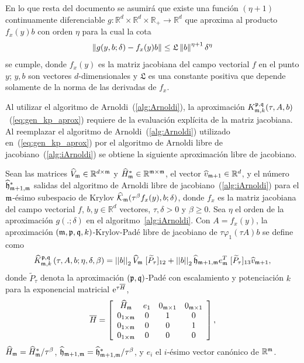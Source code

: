 En lo que resta del documento se asumirá que existe una función $(\eta+1)$ continuamente diferenciable $g: \mathbb{R}^{d}\times \mathbb{R}^{d} \times \mathbb{R}_+ \to \mathbb{R}^{d}$ que aproxima al producto $f_x(y)b$ con orden $\eta$ para la cual la cota
\begin{equation} \label{eq:g_bound}
	\left\lVert g(y,b;\delta)-f_x(y)b \right\rVert \leq \mathfrak{L}\left\lVert b \right\rVert^{\eta+1}\delta^{\eta}
\end{equation}
se cumple, donde $f_x(y)$ es la matriz jacobiana del campo vectorial $f$ en el punto $y$; $y,b$ son vectores $d$-dimensionales y $\mathfrak{L}$ es una constante positiva que depende solamente de la norma de las derivadas de $f_x$.

Al utilizar el algoritmo de Arnoldi~(\ref{alg:Arnoldi}), la aproximación $K_{\mathfrak{m},k}^{\mathfrak{p},\mathfrak{q}}(\tau,A,b)$~(\ref{eq:gen_kp_aprox}) requiere de la evaluación explícita de la matriz jacobiana. Al reemplazar el algoritmo de Arnoldi~(\ref{alg:Arnoldi}) utilizado en~(\ref{eq:gen_kp_aprox}) por el algoritmo de Arnoldi libre de jacobiano~(\ref{alg:iArnoldi}) se obtiene la siguiente aproximación libre de jacobiano.

\begin{definition}\label{def:gen_kp_aprox_fj}
	Sean las matrices $\widehat{V}_{\mathfrak{m}}\in\mathbb{R}^{d\times \mathfrak{m}}$ y $\widehat{H}^*_{\mathfrak{m}}\in\mathbb{R}^{{\mathfrak{m}} \times {\mathfrak{m}}}$, el vector $\widehat{v}_{\mathfrak{m}+1}\in\mathbb{R}^d$, y el número  $ \widehat{\mathfrak{h}}^*_{\mathfrak{m}+1,\mathfrak{m}}$ salidas del algoritmo de Arnoldi libre de jacobiano~(\ref{alg:iArnoldi}) para el $\mathfrak{m}$-ésimo subespacio de Krylov $\widehat{\mathcal{K}}_{\mathfrak{m}}(\tau^\beta f_x(y),b;\delta)$, donde $f_x$ es la matriz jacobiana del campo vectorial $f$, $b,y\in\mathbb{R}^d$ vectores, $\tau,\delta>0$ y $\beta \ge 0$. Sea $\eta$ el orden de la aproximación $g(.;\delta)$ en el algoritmo~\ref{alg:iArnoldi}. Con $A=f_x(y)$, la aproximación $(\mathfrak{m} , \mathfrak{p} ,\mathfrak{q} , k)$-Krylov-Padé libre de jacobiano de $\tau \varphi_1(\tau A)b$ se define como 
	\begin{equation} \label{eq:gen_kp_aprox_fj}
		\widehat{K}_{\mathfrak{m},k}^{\mathfrak{p},\mathfrak{q}}\left(\tau, A , b ; \eta, \delta, \beta \right)=\left\lvert \left\lvert b \right\rvert \right\rvert_2 \widehat{V}_{\mathfrak{m}}\;[\widetilde{P}_{\tau}]_{12} + \left\lvert \left\lvert b \right\rvert \right\rvert_2 \widehat{\mathfrak{h}}_{\mathfrak{m}+1,\mathfrak{m}}e_{\mathfrak{m}}^T\;[\widetilde{P}_{\tau}]_{13} \widehat{v}_{\mathfrak{m}+1},
	\end{equation}
	donde $\widetilde{P}_{\tau}$ denota la aproximación $(\mathfrak{p},\mathfrak{q})$-Padé con escalamiento y potenciación $k$ para la exponencial matricial $\mathrm{e}^{\tau\overline{H}}$, 
	\begin{equation}
		\overline{H} = \left[\begin{array}{cccc}
			\widehat{H}_{\mathfrak{m}} & e_1 & 0_{\mathfrak{m}\times 1} & 0_{\mathfrak{m}\times 1}\\
			0_{1\times\mathfrak{m}} & 0 & 1 & 0\\
			0_{1\times\mathfrak{m}} & 0 & 0 & 1\\
			0_{1\times\mathfrak{m}} & 0 & 0 & 0
		\end{array}\right],
	\end{equation}
	$\widehat{H}_{\mathfrak{m}}=\widehat{H}^*_{\mathfrak{m}}/\tau^\beta$, $\widehat{\mathfrak{h}}_{\mathfrak{m}+1,\mathfrak{m}}=\widehat{\mathfrak{h}}^*_{\mathfrak{m}+1,\mathfrak{m}}/\tau^\beta$, y $e_i$ el $i$-ésimo vector canónico de $\mathbb{R}^{\mathfrak{m}}$.
\end{definition}


